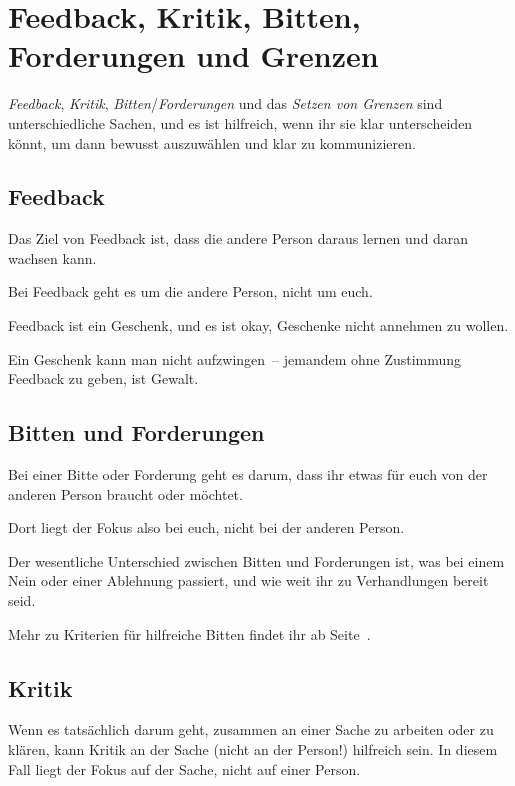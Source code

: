 \section{Feedback, Kritik, Bitten, Forderungen und Grenzen}
\label{feedback-vs-kritik}

\emph{Feedback}, \emph{Kritik}, \emph{Bitten}/\emph{Forderungen} und das \emph{Setzen von Grenzen} sind unterschiedliche Sachen, und es ist hilfreich, wenn ihr sie klar unterscheiden könnt, um dann bewusst auszuwählen und klar zu kommunizieren.


\subsection{Feedback}

Das Ziel von Feedback ist, dass die andere Person daraus lernen und daran wachsen kann.

Bei Feedback geht es um die andere Person, nicht um euch.

Feedback ist ein Geschenk, und es ist okay, Geschenke nicht annehmen zu wollen.

Ein Geschenk kann man nicht aufzwingen~-- jemandem ohne Zustimmung Feedback zu geben, ist Gewalt.


\subsection{Bitten und Forderungen}

Bei einer Bitte oder Forderung geht es darum, dass ihr etwas für euch von der anderen Person braucht oder möchtet.

Dort liegt der Fokus also bei euch, nicht bei der anderen Person.

Der wesentliche Unterschied zwischen Bitten und Forderungen ist, was bei einem Nein oder einer Ablehnung passiert, und wie weit ihr zu Verhandlungen bereit seid.

Mehr zu Kriterien für hilfreiche Bitten findet ihr ab Seite~\pageref{bitten}.


\subsection{Kritik}

Wenn es tatsächlich darum geht, zusammen an einer Sache zu arbeiten oder zu klären, kann Kritik an der Sache (nicht an der Person!) hilfreich sein. In diesem Fall liegt der Fokus auf der Sache, nicht auf einer Person.

